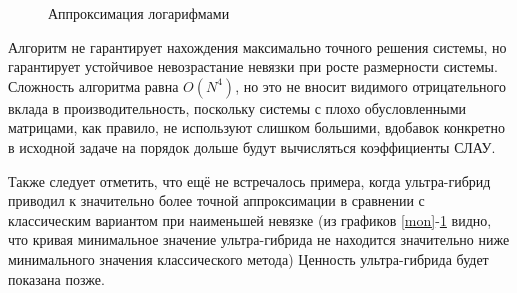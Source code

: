 \documentclass[a4paper, 12pt]{article}
\begin{document}
\begin{figure}[h!]
    \noindent{}
   \caption{Аппроксимация логарифмами}
    \label{log}
\end{figure}


Алгоритм не гарантирует нахождения максимально точного решения системы, но гарантирует устойчивое невозрастание невязки при росте размерности системы. Сложность алгоритма равна $O(N^4)$, но это не вносит видимого отрицательного вклада в производительность, поскольку системы с плохо обусловленными матрицами, как правило, не используют слишком большими, вдобавок конкретно в исходной задаче на порядок дольше будут вычисляться коэффициенты СЛАУ.

Также следует отметить, что ещё не встречалось примера, когда ультра-гибрид приводил к значительно более точной аппроксимации в сравнении с классическим вариантом при наименьшей невязке (из графиков \ref{mon}-\ref{log} видно, что кривая минимальное значение ультра-гибрида не находится значительно ниже минимального значения классического метода) Ценность ультра-гибрида будет показана позже.
\end{document}
